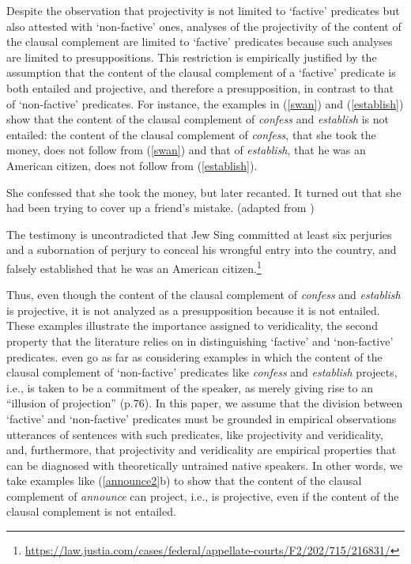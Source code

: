 \documentclass[11pt,fleqn]{article}
\newcommand{\6}{\mbox{$[\hspace*{-.6mm}[$}}
\newcommand{\9}{\mbox{$]\hspace*{-.6mm}]$}}
\begin{document}
Despite the observation that projectivity is not limited to `factive' predicates but also attested with `non-factive' ones, analyses of the projectivity of the content of the clausal complement are limited to `factive' predicates because such analyses are limited to presuppositions. This restriction is empirically justified by the assumption that the content of the clausal complement of a `factive' predicate is both entailed and projective, and therefore a presupposition, in contrast to that of `non-factive' predicates. For instance, the examples in (\ref{swan}) and (\ref{establish}) show that the content of the clausal complement of {\em confess} and {\em establish} is not entailed: the content of the clausal complement of {\em confess}, that she took the money, does not follow from (\ref{swan}) and that of {\em establish}, that he was an American citizen, does not follow from (\ref{establish}). 

\begin{exe}
\ex\label{swan} She confessed that she took the money, but later recanted. It turned out that she had been trying to cover up a friend's mistake. \hfill (adapted from \citealt[1540]{swanson2012})

\ex\label{establish} The testimony is uncontradicted that Jew Sing committed at least six perjuries and a subornation of perjury to conceal his wrongful entry into the country, and falsely established that he was an American citizen.\footnote{\url{https://law.justia.com/cases/federal/appellate-courts/F2/202/715/216831/}}

\end{exe}
Thus, even though the content of the clausal complement of {\em confess} and {\em establish} is projective, it is not analyzed as a presupposition because it is not entailed. These examples illustrate the importance assigned to veridicality, the second property that the literature relies on in distinguishing `factive' and `non-factive' predicates. \citet{anand-hacquard2014} even go as far as considering examples in which the content of the clausal complement of `non-factive' predicates like {\em confess} and {\em establish} projects, i.e., is taken to be a commitment of the speaker, as merely giving rise to an ``illusion of projection'' (p.76). In this paper, we assume that the division between `factive' and `non-factive' predicates must be grounded in empirical observations utterances of sentences with such predicates, like projectivity and veridicality, and, furthermore, that projectivity and veridicality are empirical properties that can be diagnosed with theoretically untrained native speakers. In other words, we take examples like (\ref{announce2}b) to show that the content of the clausal complement of {\em announce} can project, i.e., is projective, even if the content of the clausal complement is not entailed.
\end{document}
